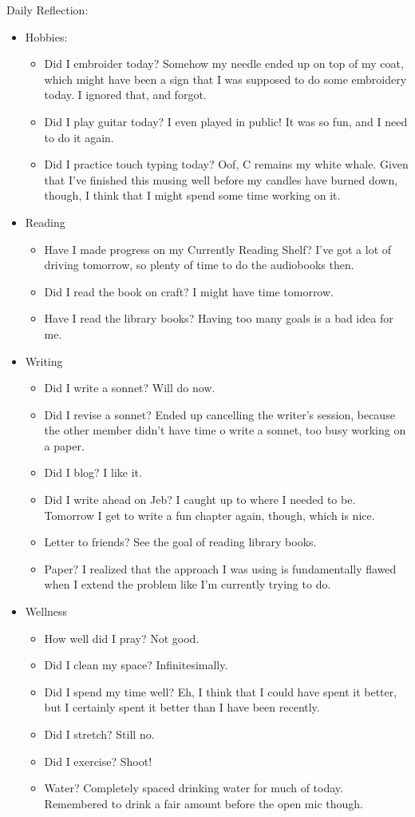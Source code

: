 \documentclass[12pt]{article}[titlepage]
\newcommand{\1}{\={a}}
\newcommand{\2}{\={e}}
\newcommand{\3}{\={\i}}
\newcommand{\4}{\=o}
\newcommand{\5}{\=u}
\newcommand{\6}{\={A}}
\renewcommand{\,}{\textsuperscript{,}}
\begin{document}
Daily Reflection:
\begin{itemize}
\item Hobbies:
\begin{itemize}
\item Did I embroider today? Somehow my needle ended up on top of my coat, which might have been a sign that I was supposed to do some embroidery today. I ignored that, and forgot.
\item Did I play guitar today? I even played in public! It was so fun, and I need to do it again.
\item Did I practice touch typing today? Oof, C remains my white whale. Given that I've finished this musing well before my candles have burned down, though, I think that I might spend some time working on it.
\end{itemize}
\item Reading
\begin{itemize}
\item Have I made progress on my Currently Reading Shelf? I've got a lot of driving tomorrow, so plenty of time to do the audiobooks then.
\item Did I read the book on craft? I might have time tomorrow.
\item Have I read the library books? Having too many goals is a bad idea for me.
\end{itemize}
\item Writing
\begin{itemize}
\item Did I write a sonnet? Will do now.
\item Did I revise a sonnet? Ended up cancelling the writer's session, because the other member didn't have time o write a sonnet, too busy working on a paper.
\item Did I blog? I like it.
\item Did I write ahead on Jeb? I caught up to where I needed to be. Tomorrow I get to write a fun chapter again, though, which is nice.
\item Letter to friends? See the goal of reading library books.
\item Paper? I realized that the approach I was using is fundamentally flawed when I extend the problem like I'm currently trying to do.
\end{itemize}
\item Wellness
\begin{itemize}
\item How well did I pray? Not good.
\item Did I clean my space? Infinitesimally.
\item Did I spend my time well? Eh, I think that I could have spent it better, but I certainly spent it better than I have been recently.
\item Did I stretch? Still no.
\item Did I exercise? Shoot!
\item Water? Completely spaced drinking water for much of today. Remembered to drink a fair amount before the open mic though.
\end{itemize}
\end{itemize}
\end{document}
